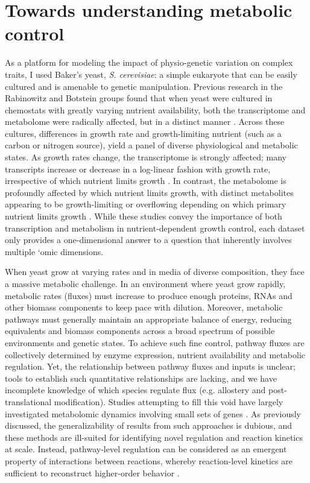 \section{Towards understanding metabolic control}

As a platform for modeling the impact of physio-genetic variation on complex traits, I used Baker's yeast, \textit{S. cerevisiae}: a simple eukaryote that can be easily cultured and is amenable to genetic manipulation. Previous research in the Rabinowitz and Botstein groups found that when yeast were cultured in chemostats with greatly varying nutrient availability, both the transcriptome and metabolome were radically affected, but in a distinct manner \cite{Brauer:2008jn, Boer:2010fb}. Across these cultures, differences in growth rate and growth-limiting nutrient (such as a carbon or nitrogen source), yield a panel of diverse physiological and metabolic states. As growth rates change, the transcriptome is strongly affected; many transcripts increase or decrease in a log-linear fashion with growth rate, irrespective of which nutrient limits growth \cite{Brauer:2008jn}. In contrast, the metabolome is profoundly affected by which nutrient limits growth, with distinct metabolites appearing to be growth-limiting or overflowing depending on which primary nutrient limits growth \cite{Boer:2010fb}. While these studies convey the importance of both transcription and metabolism in nutrient-dependent growth control, each dataset only provides a one-dimensional answer to a question that inherently involves multiple `omic dimensions.

When yeast grow at varying rates and in media of diverse composition, they face a massive metabolic challenge. In an environment where yeast grow rapidly, metabolic rates (fluxes) must increase to produce enough  proteins, RNAs and other biomass components to keep pace with dilution.  Moreover, metabolic pathways must generally maintain an appropriate balance of energy, reducing equivalents and biomass components across a broad spectrum of possible environments and genetic states. To achieve such fine control, pathway fluxes are collectively determined by enzyme expression, nutrient availability and metabolic regulation. Yet, the relationship between pathway fluxes and inputs is unclear; tools to establish such quantitative relationships are lacking, and we have incomplete knowledge of which species regulate flux (e.g. allostery and post-translational modification). Studies attempting to fill this void have largely investigated metabolomic dynamics involving small sets of genes \cite{Zampar:2013fr, Link:2013dj}. As previously discussed, the generalizability of results from such approaches is dubious, and these methods are ill-suited for identifying novel regulation and reaction kinetics at scale. Instead, pathway-level regulation can be considered as an emergent property of interactions between reactions, whereby reaction-level kinetics are sufficient to reconstruct higher-order behavior \cite{Fell:1997wg}.

